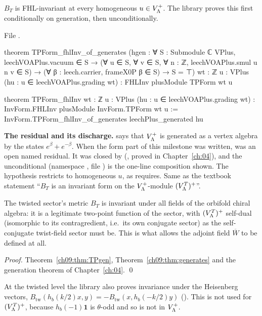 \begin{theorem}\label{ch09:thm:TPinv}
$B_T$ is FHL-invariant at every homogeneous $u\in V_{\Lambda}^{+}$. The library proves this first
conditionally on generation, then unconditionally.
\end{theorem}
\noindent File .
\begin{leancode}
theorem TPForm_fhlInv_of_generates
    (hgen : ∀ S : Submodule ℂ VPlus, leechVOAPlus.vacuum ∈ S →
      (∀ u ∈ S, ∀ v ∈ S, ∀ n : ℤ, leechVOAPlus.smul u n v ∈ S) →
      (∀ β : leech.carrier, frameX0P β ∈ S) → S = ⊤)
    {wt : ℤ} {u : VPlus} (hu : u ∈ leechVOAPlus.grading wt) :
    FHLInv plusModule TPForm wt u

theorem TPForm_fhlInv {wt : ℤ} {u : VPlus} (hu : u ∈ leechVOAPlus.grading wt) :
    InvForm.FHLInv plusModule InvForm.TPForm wt u :=
  InvForm.TPForm_fhlInv_of_generates leechPlus_generated hu
\end{leancode}
\begin{dictionary}
\textbf{The residual and its discharge.}  says that $V_{\Lambda}^{+}$ is generated as a vertex
algebra by the states $e^\beta+e^{-\beta}$. When the form part of this milestone was written,
 was an open named residual. It was closed by 
(, proved in Chapter~\ref{ch:04}), and the unconditional
 (namespace , file )
is the one-line composition shown. The hypothesis  restricts to homogeneous $u$, as
 requires. Same as the textbook statement ``$B_T$ is an invariant form on the
$V_{\Lambda}^{+}$-module $(V_{\Lambda}^{T})^{+}$''.
\end{dictionary}
\begin{physics}
The twisted sector's metric $B_T$ is invariant under all fields of the orbifold chiral algebra: it is a legitimate two-point function of the sector, with $(V_{\Lambda}^{T})^{+}$ self-dual (isomorphic to its contragredient, i.e.\ its own conjugate sector) as the self-conjugate twist-field sector must be. This is what allows the adjoint field $\overline W$ to be defined at all.
\end{physics}

\noindent\emph{Proof.} Theorem~\ref{ch09:thm:TPgen}, Theorem~\ref{ch09:thm:generates} and the
generation theorem of Chapter~\ref{ch:04}. \qed

\begin{remark}
At the twisted level the library also proves invariance under the Heisenberg vectors,
$B_{\mathrm{tw}}(h_b(k/2)x,y)=-B_{\mathrm{tw}}(x,h_b(-k/2)y)$ (). This is
not used for $(V_{\Lambda}^{T})^{+}$, because $h_b(-1)\mathbf1$ is $\theta$-odd and so is not in $V_{\Lambda}^{+}$.
\end{remark}

